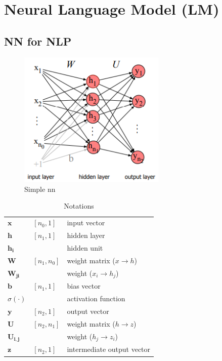 \chapter{Neural Language Model (LM)}

\section{NN for NLP \cite{nlp-1}}

\begin{table}[H]
    \begin{minipage}{0.45\linewidth}
        \begin{figure}[H]
            \centering
            \includegraphics[height=6.5cm]{Pictures/nlp/simple-nn-nlp.png}
            \caption{Simple nn}
        \end{figure}
    \end{minipage}
    \hfill
    \begin{minipage}{0.45\linewidth}
        \begin{table}[H]
            \begin{tabular}{l l l}
                 $\mathbf{x}$ & $[n_0, 1]$ & input vector \\
                 $\mathbf{h}$ & $[n_1, 1]$ & hidden layer \\
                 $\mathbf{h_i}$ &  & hidden unit \\
                 $\mathbf{W}$ & $[n_1, n_0]$ & weight matrix  ($x \rightarrow h$) \\
                 $\mathbf{W_{ji}}$ &  & weight ($x_i \rightarrow h_j$) \\
                 $\mathbf{b}$ & $[n_1, 1]$ & bias vector \\
                 $\sigma(\cdot)$ & & activation function \\
                 $\mathbf{y}$ & $[n_2, 1]$ & output vector \\
                 $\mathbf{U}$ & $[n_2, n_1]$ & weight matrix ($h \rightarrow z$) \\
                 $\mathbf{U_{i,j}}$ & & weight ($h_j \rightarrow z_i$) \\
                 $\mathbf{z}$ & $[n_2, 1]$ & intermediate output vector \\
            \end{tabular}
            \caption{Notations}
        \end{table}
    \end{minipage}
\end{table}

